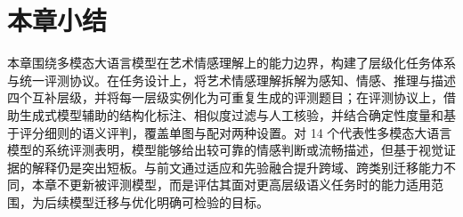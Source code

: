 
\FloatBarrier

\section{本章小结}

本章围绕多模态大语言模型在艺术情感理解上的能力边界，构建了层级化任务体系与统一评测协议。在任务设计上，将艺术情感理解拆解为感知、情感、推理与描述四个互补层级，并将每一层级实例化为可重复生成的评测题目；在评测协议上，借助生成式模型辅助的结构化标注、相似度过滤与人工核验，并结合确定性度量和基于评分细则的语义评判，覆盖单图与配对两种设置。对 14 个代表性多模态大语言模型的系统评测表明，模型能够给出较可靠的情感判断或流畅描述，但基于视觉证据的解释仍是突出短板。与前文通过适应和先验融合提升跨域、跨类别迁移能力不同，本章不更新被评测模型，而是评估其面对更高层级语义任务时的能力适用范围，为后续模型迁移与优化明确可检验的目标。

